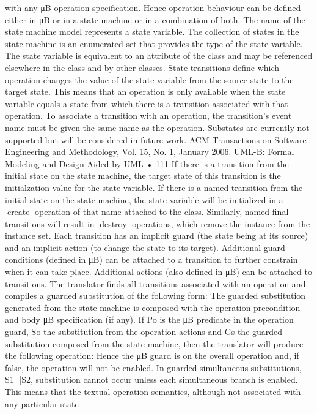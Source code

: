 with any μB operation specification. Hence operation behaviour can be defined
either in μB or in a state machine or in a combination of both. The name of
the state machine model represents a state variable. The collection of states
in the state machine is an enumerated set that provides the type of the state
variable. The state variable is equivalent to an attribute of the class and may be
referenced elsewhere in the class and by other classes. State transitions define
which operation changes the value of the state variable from the source state to
the target state. This means that an operation is only available when the state
variable equals a state from which there is a transition associated with that
operation. To associate a transition with an operation, the transition’s event
name must be given the same name as the operation. Substates are currently
not supported but will be considered in future work.
ACM Transactions on Software Engineering and Methodology, Vol. 15, No. 1, January 2006.
UML-B: Formal Modeling and Design Aided by UML • 111
If there is a transition from the initial state on the state machine, the target
state of this transition is the initialzation value for the state variable. If there is
a named transition from the initial state on the state machine, the state variable
will be initialized in a create operation of that name attached to the class.
Similarly, named final transitions will result in destroy operations, which
remove the instance from the instance set.
Each transition has an implicit guard (the state being at its source) and an
implicit action (to change the state to its target). Additional guard conditions
(defined in μB) can be attached to a transition to further constrain when it can
take place. Additional actions (also defined in μB) can be attached to transitions.
The translator finds all transitions associated with an operation and compiles
a guarded substitution of the following form:
The guarded substitution generated from the state machine is composed with
the operation precondition and body μB specification (if any). If Po is the μB
predicate in the operation guard, So the substitution from the operation actions
and Gs the guarded substitution composed from the state machine, then the
translator will produce the following operation:
Hence the μB guard is on the overall operation and, if false, the operation will
not be enabled. In guarded simultaneous substitutions, S1 ||S2, substitution
cannot occur unless each simultaneous branch is enabled. This means that the
textual operation semantics, although not associated with any particular state
